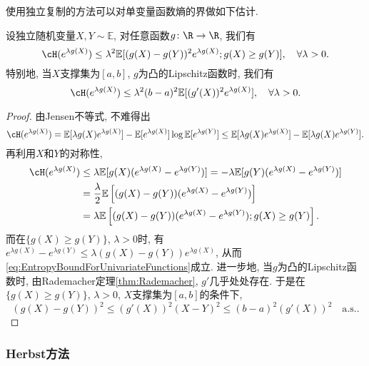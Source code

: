 使用独立复制的方法可以对单变量函数熵的界做如下估计. 
\begin{lemma}[单变量函数熵的界]\label{lemma:EntropyBoundForUnivariateFunctions}
	设独立随机变量$X, Y \sim \mathbb{E}$, 对任意函数$g \colon \R \to \R$, 我们有
	\begin{equation}\label{eq:EntropyBoundForUnivariateFunctions}
		\cH(e^{\lambda g(X)})
		\leq \lambda^2 \mathbb{E}[ (g(X) - g(Y))^2 e^{\lambda g(X)}; g(X) \geq g(Y) ], \quad \forall \lambda > 0.
	\end{equation}
	特别地, 当$X$支撑集为$[a, b]$, $g$为凸的Lipschitz函数时, 我们有
	\begin{equation*}
		\cH(e^{\lambda g(X)}) 
		\leq \lambda^2 (b-a)^2 \mathbb{E}[(g'(X))^2 e^{\lambda g(X)}], \quad \forall \lambda > 0.
	\end{equation*}
\end{lemma}
\begin{proof}
	由Jensen不等式, 不难得出
	\begin{equation*}
		\cH(e^{\lambda g(X)})
		= \mathbb{E}[\lambda g(X) e^{\lambda g(X)}] - \mathbb{E}[e^{\lambda g(X)}] \log \mathbb{E}[e^{\lambda g(Y)}] 
		\leq \mathbb{E}[\lambda g(X) e^{\lambda g(X)}] - \mathbb{E}[\lambda g(X) e^{\lambda g(Y)}].
	\end{equation*}
	再利用$X$和$Y$的对称性, 
	\begin{align*}
		\cH(e^{\lambda g(X)})
		&\leq \lambda \mathbb{E}[ g(X) (e^{\lambda g(X)}-  e^{\lambda g(Y)})] 
		= - \lambda \mathbb{E}[ g(Y) (e^{\lambda g(X)}-  e^{\lambda g(Y)})] \\
		&= \frac{\lambda}{2} \mathbb{E}\left[(g(X) - g(Y)) (e^{\lambda g(X)} - e^{\lambda g(Y)})\right] \\
		&= \lambda \mathbb{E}\left[(g(X) - g(Y)) (e^{\lambda g(X)} - e^{\lambda g(Y)}); g(X) \geq g(Y) \right].
	\end{align*}
	而在$\{g(X) \geq g(Y)\}$, $\lambda > 0$时, 有$e^{\lambda g(X)} - e^{\lambda g(Y)} \leq \lambda(g(X) - g(Y)) e^{\lambda g(X)}$, 从而\eqref{eq:EntropyBoundForUnivariateFunctions}成立. 
	进一步地, 当$g$为凸的Lipschitz函数时, 由Rademacher定理\ref{thm:Rademacher}, $g'$几乎处处存在. 
	于是在$\{g(X) \geq g(Y)\}$, $\lambda > 0$, $X$支撑集为$[a, b]$的条件下,
	\begin{equation*}
		(g(X) - g(Y))^2 \leq (g'(X))^2 (X-Y)^2 \leq (b-a)^2 (g'(X))^2 \quad \text{a.s.}.
	\end{equation*}
\end{proof}

\subsubsection{Herbst方法}

